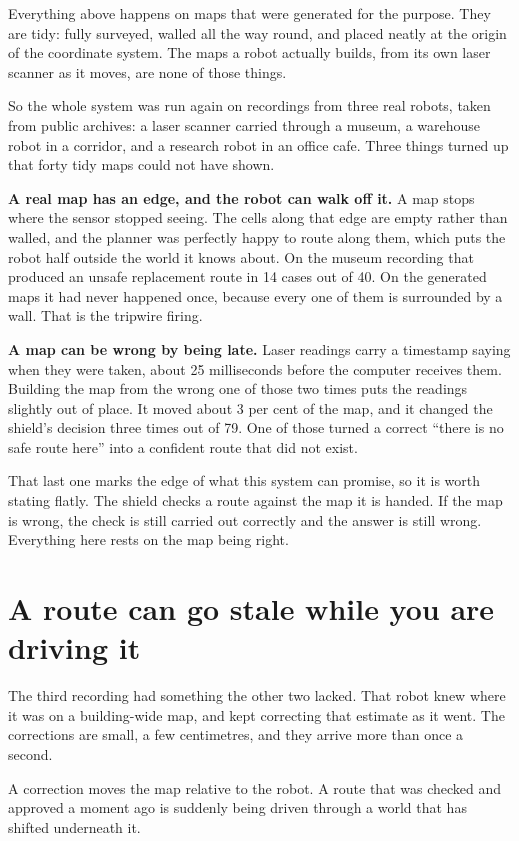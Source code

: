 \documentclass[11pt,a4paper]{article}
\begin{document}
Everything above happens on maps that were generated for the purpose. They are tidy: fully surveyed, walled all the way round, and placed neatly at the origin of the coordinate system. The maps a robot actually builds, from its own laser scanner as it moves, are none of those things.

So the whole system was run again on recordings from three real robots, taken from public archives: a laser scanner carried through a museum, a warehouse robot in a corridor, and a research robot in an office cafe. Three things turned up that forty tidy maps could not have shown.

\textbf{A real map has an edge, and the robot can walk off it.} A map stops where the sensor stopped seeing. The cells along that edge are empty rather than walled, and the planner was perfectly happy to route along them, which puts the robot half outside the world it knows about. On the museum recording that produced an unsafe replacement route in 14 cases out of 40. On the generated maps it had never happened once, because every one of them is surrounded by a wall. That is the tripwire firing.

\textbf{A map can be wrong by being late.} Laser readings carry a timestamp saying when they were taken, about 25 milliseconds before the computer receives them. Building the map from the wrong one of those two times puts the readings slightly out of place. It moved about 3 per cent of the map, and it changed the shield's decision three times out of 79. One of those turned a correct ``there is no safe route here'' into a confident route that did not exist.

That last one marks the edge of what this system can promise, so it is worth stating flatly. The shield checks a route against the map it is handed. If the map is wrong, the check is still carried out correctly and the answer is still wrong. Everything here rests on the map being right.

\section{A route can go stale while you are driving it}

The third recording had something the other two lacked. That robot knew where it was on a building-wide map, and kept correcting that estimate as it went. The corrections are small, a few centimetres, and they arrive more than once a second.

A correction moves the map relative to the robot. A route that was checked and approved a moment ago is suddenly being driven through a world that has shifted underneath it.
\end{document}
